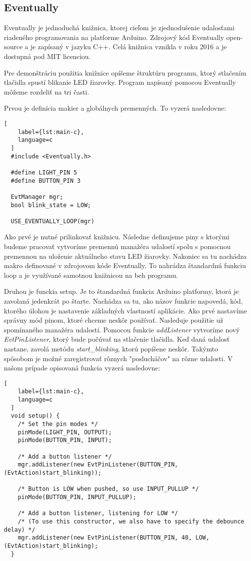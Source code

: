\subsection{Eventually}
\noindent Eventually je jednoduchá knižnica, ktorej cieľom je zjednodušenie udalosťami riadeného 
programovania na platforme Arduino. Zdrojový kód Eventually open-source a je zapísaný v jazyku C++. Celá knižnica vznikla v roku 2016 a je dostupná pod MIT licenciou.
\par Pre demonštráciu použitia knižnice opíšeme štruktúru programu, ktorý stlačením tlačidla spustí blikanie LED žiarovky. Program napísaný pomocou Eventually môžeme rozdeliť na tri časti.

\par Prvou je definícia makier a globálnych premenných. To vyzerá nasledovne: 
\begin{lstlisting}[
    label={lst:main-c},
    language=c
  ]  
  #include <Eventually.h>

  #define LIGHT_PIN 5
  #define BUTTON_PIN 3
  
  EvtManager mgr;
  bool blink_state = LOW;

  USE_EVENTUALLY_LOOP(mgr)
\end{lstlisting}

Ako prvé je nutné prilinkovať knižnicu. Následne definujeme piny s ktorými budeme pracovať vytvoríme premennú manažéra udalostí spolu s pomocnou premennou na uloženie aktuálneho stavu LED žiarovky. Nakoniec sa tu nachádza makro definované v zdrojovom kóde Eventually. To nahrádza štandardnú funkciu loop a je využívané samotnou knižnicou na beh programu.

\par Druhou je funckia setup. Je to štandardná funkcia Arduino platformy, ktorá je zavolaná 
jedenkrát po štarte. Nachádza sa tu, ako názov funkcie napovedá, kód, ktorého úlohou je 
nastavenie základných vlastností aplikácie. Ako prvé nastavíme správny mód pinom, ktoré chceme neskôr používať. Nasleduje použitie už
spomínaného manažéra udalostí. Pomocou funkcie \textit{addListener} vytvoríme nový \textit{EvtPinListener}, ktorý bude počúvať na stlačenie tlačidla. Keď daná udalosť nastane, zavolá metódu \textit{start\_blinking}, ktorú popíšene neskôr. Takýmto spôsobom je možné zaregistrovať rôznych "poslucháčov" na rôzne udalosti. V našom prípade opisovaná funkcia vyzerá nasledovne: 

\begin{lstlisting}[
    label={lst:main-c},
    language=c
  ]  
  void setup() {
    /* Set the pin modes */
    pinMode(LIGHT_PIN, OUTPUT);
    pinMode(BUTTON_PIN, INPUT);
  
    /* Add a button listener */
    mgr.addListener(new EvtPinListener(BUTTON_PIN, (EvtAction)start_blinking));

    /* Button is LOW when pushed, so use INPUT_PULLUP */
    pinMode(BUTTON_PIN, INPUT_PULLUP);

    /* Add a button listener, listening for LOW */
    /* (To use this constructor, we also have to specify the debounce delay) */
    mgr.addListener(new EvtPinListener(BUTTON_PIN, 40, LOW, (EvtAction)start_blinking);
  }
\end{lstlisting}

